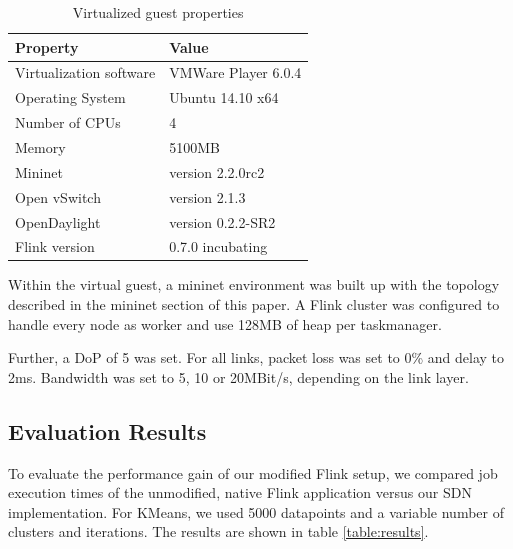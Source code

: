 \begin{table}[h]
    \centering
    \begin{tabular}{| l | l | }
        \hline
        \textbf{Property} & \textbf{Value} \\ \hline
        Virtualization software & VMWare Player 6.0.4 \\ \hline
        Operating System & Ubuntu 14.10 x64 \\ \hline
        Number of CPUs & 4 \\ \hline
        Memory & 5100MB \\ \hline
        Mininet & version 2.2.0rc2 \\ \hline
        Open vSwitch & version 2.1.3 \\ \hline
        OpenDaylight & version 0.2.2-SR2 \\ \hline
        Flink version & 0.7.0 incubating \\ \hline
    \end{tabular}
    \caption{Virtualized guest properties}
    \label{table:guest_properties}
\end{table}

Within the virtual guest, a mininet environment was built up with the topology described in the
mininet section of this paper. A Flink cluster was configured to handle every node as worker and use
128MB of heap per taskmanager.

Further, a DoP of 5 was set. For all links, packet loss was set to 0\% and delay to 2ms. Bandwidth
was set to 5, 10 or 20MBit/s, depending on the link layer.

\subsection{Evaluation Results}
To evaluate the performance gain of our modified Flink setup, we compared job execution times of the
unmodified, native Flink application versus our SDN implementation. For KMeans, we used 5000
datapoints and a variable number of clusters and iterations. The results are shown in table
\ref{table:results}.

